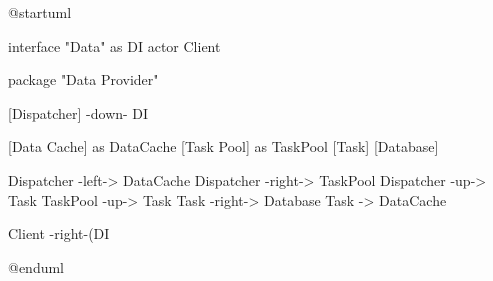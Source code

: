 \begin{plantuml}
    @startuml

    interface "Data\nInterface" as DI
    actor Client

    package "Data Provider" {
        [Dispatcher] -down- DI

        [Data Cache] as DataCache
        [Task Pool] as TaskPool
        [Task]
        [Database]

        Dispatcher -left-> DataCache
        Dispatcher -right-> TaskPool
        Dispatcher -up-> Task
        TaskPool -up-> Task
        Task -right-> Database
        Task -> DataCache
    }

    Client -right-(DI

    @enduml
\end{plantuml}
